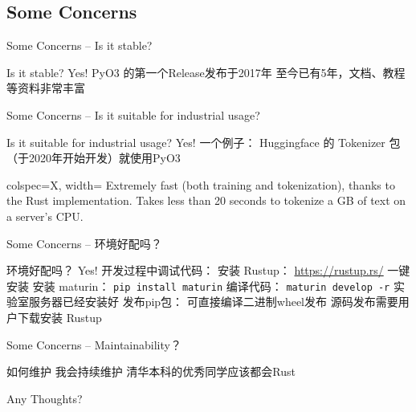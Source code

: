 \documentclass[aspectratio=169]{ctexbeamer}
\begin{document}
\subsection{Some Concerns}
\begin{frame}[fragile]{Some Concerns -- Is it stable?}
    \begin{outline}
        \1 Is it stable? \pause
        \1 Yes! \pause
        \1 PyO3 的第一个Release发布于2017年
        \1 至今已有5年，文档、教程等资料非常丰富
    \end{outline}
\end{frame}
\begin{frame}[fragile]{Some Concerns -- Is it suitable for industrial usage?}
    \begin{outline}
        \1 Is it suitable for industrial usage? \pause
        \1 Yes! \pause
        \1 一个例子：
            \2 Huggingface 的 Tokenizer 包（于2020年开始开发）就使用PyO3
            \begin{tblr}{
                colspec={X},
                width=\linewidth
            }
            \vline[2pt, gray8]
                Extremely fast (both training and tokenization), thanks to the Rust implementation. Takes less than 20 seconds to tokenize a GB of text on a server's CPU.
            \end{tblr}
    \end{outline}
\end{frame}
\begin{frame}[fragile]{Some Concerns -- 环境好配吗？}
    \begin{outline}
        \1 环境好配吗？ \pause
        \1 Yes! \pause
        \1 开发过程中调试代码：
            \2 安装 Rustup： \url{https://rustup.rs/} 一键安装
            \2 安装 maturin： \texttt{pip install maturin}
            \2 编译代码： \texttt{maturin develop -r}
            \2 实验室服务器已经安装好
        \1 发布pip包：
            \2 可直接编译二进制wheel发布
            \2 源码发布需要用户下载安装 Rustup
    \end{outline}
\end{frame}
\begin{frame}[fragile]{Some Concerns -- Maintainability？}
    \begin{outline}
        \1 如何维护 \pause
        \1 我会持续维护
        \1 清华本科的优秀同学应该都会Rust
    \end{outline}
\end{frame}
\begin{frame}[standout]
    Any Thoughts?
\end{frame}
\end{document}
